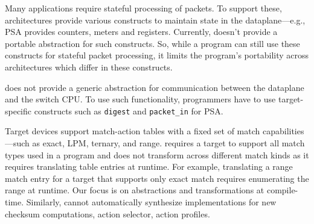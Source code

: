 \documentclass[letterpaper,twocolumn,10pt]{article}
\begin{document}
Many applications require stateful processing of packets. To support
these, architectures provide various constructs to maintain state in
the dataplane---e.g., PSA provides counters, meters and registers.
Currently, \uarch doesn't provide a portable abstraction for such
constructs. So, while a \ulang program can still use these constructs
for stateful packet processing, it limits the program's portability
across architectures which differ in these constructs.

\uarch does not provide a generic abstraction for communication
between the dataplane and the switch CPU. To use such functionality,
programmers have to use target-specific constructs such as
\texttt{digest} and \texttt{packet\_in} for PSA.

Target devices support match-action tables with a fixed set of match
capabilities---such as exact, LPM, ternary, and range. \ulang requires
a target to support all match types used in a program and \ucomp does
not transform across different match kinds as it requires translating
table entries at runtime. For example, translating a range match entry
for a target that supports only exact match requires enumerating the
range at runtime.  Our focus is on abstractions and transformations at
compile-time. Similarly, \ulang cannot automatically synthesize
implementations for new checksum computations, action selector, action
profiles.


\end{document}
